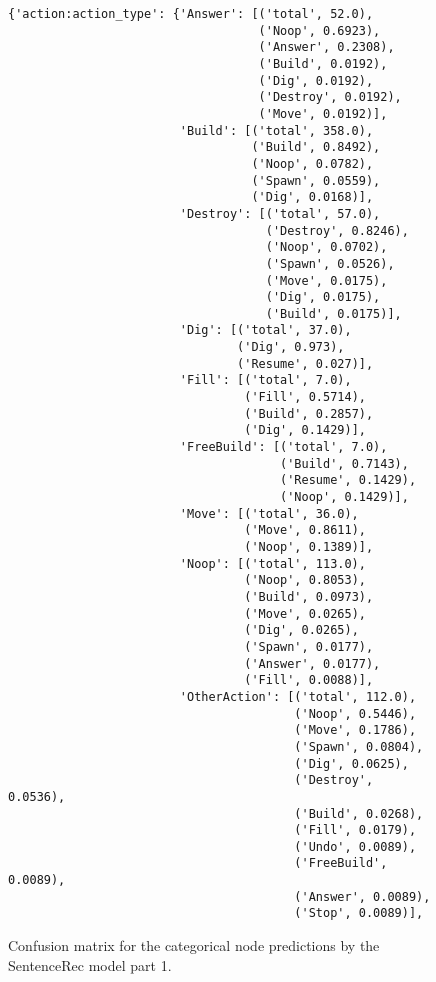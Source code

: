 \begin{figure}[t]
    \centering
    \begin{verbatim}
{'action:action_type': {'Answer': [('total', 52.0),
                                   ('Noop', 0.6923),
                                   ('Answer', 0.2308),
                                   ('Build', 0.0192),
                                   ('Dig', 0.0192),
                                   ('Destroy', 0.0192),
                                   ('Move', 0.0192)],
                        'Build': [('total', 358.0),
                                  ('Build', 0.8492),
                                  ('Noop', 0.0782),
                                  ('Spawn', 0.0559),
                                  ('Dig', 0.0168)],
                        'Destroy': [('total', 57.0),
                                    ('Destroy', 0.8246),
                                    ('Noop', 0.0702),
                                    ('Spawn', 0.0526),
                                    ('Move', 0.0175),
                                    ('Dig', 0.0175),
                                    ('Build', 0.0175)],
                        'Dig': [('total', 37.0),
                                ('Dig', 0.973),
                                ('Resume', 0.027)],
                        'Fill': [('total', 7.0),
                                 ('Fill', 0.5714),
                                 ('Build', 0.2857),
                                 ('Dig', 0.1429)],
                        'FreeBuild': [('total', 7.0),
                                      ('Build', 0.7143),
                                      ('Resume', 0.1429),
                                      ('Noop', 0.1429)],
                        'Move': [('total', 36.0),
                                 ('Move', 0.8611),
                                 ('Noop', 0.1389)],
                        'Noop': [('total', 113.0),
                                 ('Noop', 0.8053),
                                 ('Build', 0.0973),
                                 ('Move', 0.0265),
                                 ('Dig', 0.0265),
                                 ('Spawn', 0.0177),
                                 ('Answer', 0.0177),
                                 ('Fill', 0.0088)],
                        'OtherAction': [('total', 112.0),
                                        ('Noop', 0.5446),
                                        ('Move', 0.1786),
                                        ('Spawn', 0.0804),
                                        ('Dig', 0.0625),
                                        ('Destroy', 0.0536),
                                        ('Build', 0.0268),
                                        ('Fill', 0.0179),
                                        ('Undo', 0.0089),
                                        ('FreeBuild', 0.0089),
                                        ('Answer', 0.0089),
                                        ('Stop', 0.0089)],
    \end{verbatim}
    \caption{Confusion matrix for the categorical node predictions by the SentenceRec model part 1.}
    \label{fig:conf_cat_senrec_1}
\end{figure}

